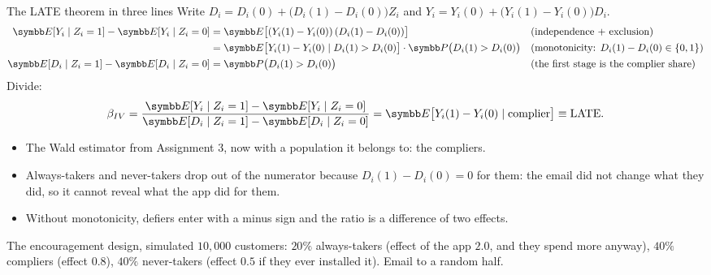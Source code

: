 \documentclass[aspectratio=169,11pt]{beamer}
\begin{document}
\begin{frame}{The LATE theorem in three lines}
\small
Write $D_i = D_i(0) + \big(D_i(1) - D_i(0)\big) Z_i$ and $Y_i = Y_i(0) + \big(Y_i(1) - Y_i(0)\big) D_i$.
\begin{align*}
	\E[Y_i \mid Z_i = 1] - \E[Y_i \mid Z_i = 0]
	&= \E\big[(Y_i(1) - Y_i(0))\,(D_i(1) - D_i(0))\big] && \text{(independence + exclusion)} \\
	&= \E\big[Y_i(1) - Y_i(0) \mid D_i(1) > D_i(0)\big] \cdot \Pr\big(D_i(1) > D_i(0)\big) && \text{(monotonicity: } D_i(1) - D_i(0) \in \{0, 1\}) \\
	\E[D_i \mid Z_i = 1] - \E[D_i \mid Z_i = 0] &= \Pr\big(D_i(1) > D_i(0)\big) && \text{(the first stage is the complier share)}
\end{align*}
Divide:
\begin{align*}
	\beta_{IV} = \frac{\E[Y_i \mid Z_i = 1] - \E[Y_i \mid Z_i = 0]}{\E[D_i \mid Z_i = 1] - \E[D_i \mid Z_i = 0]}
	= \E\big[Y_i(1) - Y_i(0) \mid \text{complier}\big] \equiv \text{LATE}.
\end{align*}
\begin{itemize}
	\item The Wald estimator from Assignment 3, now with a population it belongs to: the compliers.
	\item Always-takers and never-takers drop out of the numerator because $D_i(1) - D_i(0) = 0$ for them:
	the email did not change what they did, so it cannot reveal what the app did for them.
	\item Without monotonicity, defiers enter with a minus sign and the ratio is a difference of two effects.
\end{itemize}
\end{frame}


\begin{frame}{The encouragement design, simulated}
$10{,}000$ customers: $20\%$ always-takers (effect of the app $2.0$, and they spend more anyway), $40\%$
compliers (effect $0.8$), $40\%$ never-takers (effect $0.5$ if they ever installed it). Email to a random half.
\begin{center}
\small

\end{center}
\end{frame}
\end{document}
